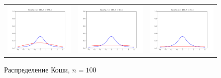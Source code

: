 	\begin{figure}[H]
		\centering
		\begin{tabular}{ccc}
			\includegraphics[width=55mm, height =0.25\textheight]{pics/ker_c_100_1.png}
			&
			\includegraphics[width=55mm, height =0.25\textheight]{pics/ker_c_100_2.png}
			&
			\includegraphics[width=55mm, height =0.25\textheight]{pics/ker_c_100_3.png}
		\end{tabular}
		\caption{Распределение Коши, $n = 100$}
		\label{fig:cauchy}
	\end{figure}
	

